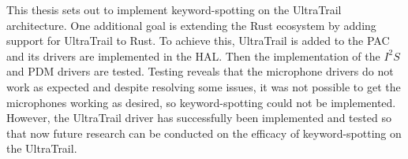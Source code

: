 
This thesis sets out to implement keyword-spotting on the UltraTrail architecture.
One additional goal is extending the Rust ecosystem by adding support for UltraTrail to Rust.
To achieve this, UltraTrail is added to the PAC and its drivers are implemented in the HAL.
Then the implementation of the $I^2S$ and PDM drivers are tested.
Testing reveals that the microphone drivers do not work as expected and despite
resolving some issues, it was not possible to get the microphones working as desired,
so keyword-spotting could not be implemented.
However, the UltraTrail driver has successfully been implemented and tested so that
now future research can be conducted on the efficacy of keyword-spotting on the UltraTrail.
